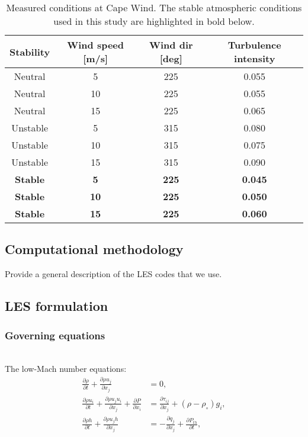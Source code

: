 \begin{table}
\caption{\label{tab:CapeWindMeasurements} Measured conditions at Cape
  Wind.  The stable atmospheric conditions used in this study are
  highlighted in bold below.} \centering
\begin{tabular}{cccc}
  \hline
  Stability    & Wind speed [m/s] & Wind dir [deg] & Turbulence intensity \\
  \hline
  Neutral      & 5                & 225            & 0.055           \\
  Neutral      & 10               & 225            & 0.055           \\
  Neutral      & 15               & 225            & 0.065           \\
  Unstable     & 5                & 315            & 0.080           \\
  Unstable     & 10               & 315            & 0.075           \\
  Unstable     & 15               & 315            & 0.090           \\
  \bf{Stable}  & \bf{5}           & \bf{225}       & \bf{0.045}      \\
  \bf{Stable}  & \bf{10}          & \bf{225}       & \bf{0.050}      \\
  \bf{Stable}  & \bf{15}          & \bf{225}       & \bf{0.060}      \\
\hline
\end{tabular}
\end{table}


\subsection{Computational methodology}
Provide a general description of the LES codes that we use.

\subsection{LES formulation}

\subsubsection{Governing equations}
\\

The low-Mach number equations:
\begin{align}
  \frac{\partial \rho} {\partial t} + \frac{\partial \rho u_j}{\partial x_j} & = 0, \\
\frac{\partial \rho u_i}{\partial t} + \frac{\partial \rho u_j u_i}{\partial x_j}
+ \frac{\partial P}{\partial x_i} & = \frac{\partial \tau_{ij}}{\partial x_j}
+ \left( \rho - \rho_{\circ} \right) g_i, \\
\frac{\partial \rho h}{\partial t} + \frac{\partial \rho u_j h}{\partial x_j} & =
- \frac{\partial q_j}{\partial x_j} + \frac{\partial P_{th}}{\partial t},
\end{align}

